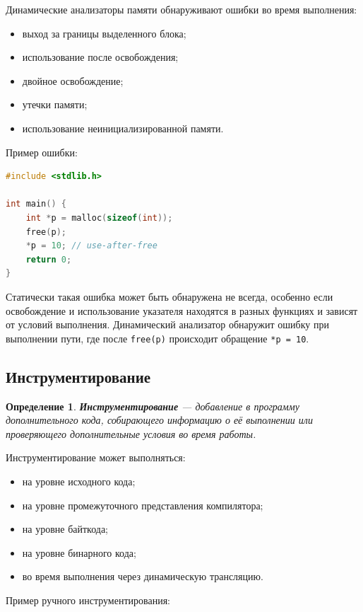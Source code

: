 \documentclass[12pt,a4paper]{article}
\newtheorem{definition}{Определение}
\begin{document}
Динамические анализаторы памяти обнаруживают ошибки во время выполнения:

\begin{itemize}
  \item выход за границы выделенного блока;
  \item использование после освобождения;
  \item двойное освобождение;
  \item утечки памяти;
  \item использование неинициализированной памяти.
\end{itemize}

Пример ошибки:

\begin{lstlisting}[language=C]
#include <stdlib.h>

int main() {
    int *p = malloc(sizeof(int));
    free(p);
    *p = 10; // use-after-free
    return 0;
}
\end{lstlisting}

Статически такая ошибка может быть обнаружена не всегда, особенно если освобождение и использование указателя находятся в разных функциях и зависят от условий выполнения. Динамический анализатор обнаружит ошибку при выполнении пути, где после \texttt{free(p)} происходит обращение \texttt{*p = 10}.

\subsection{Инструментирование}

\begin{definition}
\textbf{Инструментирование} --- добавление в программу дополнительного кода, собирающего информацию о её выполнении или проверяющего дополнительные условия во время работы.
\end{definition}

Инструментирование может выполняться:

\begin{itemize}
  \item на уровне исходного кода;
  \item на уровне промежуточного представления компилятора;
  \item на уровне байткода;
  \item на уровне бинарного кода;
  \item во время выполнения через динамическую трансляцию.
\end{itemize}

Пример ручного инструментирования:
\end{document}
